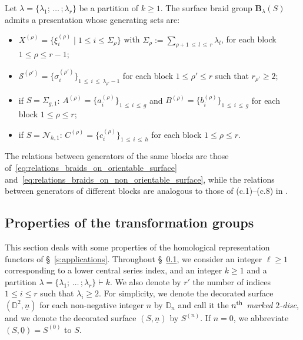 \documentclass[AHL,Unicode,published]{cedram}
\newcommand{\B}{\ensuremath{\mathbf{B}}}
\newcommand{\sS}{\mathscr{S}}
\newcommand{\N}{\mathscr{N}}
\newcommand{\bD}{\mathbb{D}}
\renewcommand{\geq}{\geqslant}
\renewcommand{\leq}{\leqslant}
\begin{document}
\begin{prop}\label{prop:partitioned_braid_groups_generating_sets}
Let $\lambda = \boldsymbol{\{} \lambda_{1};\,\ldots\,;\lambda_{r} \boldsymbol{\}}$ be a partition of $k\geq 1$. The surface braid group $\B_{\lambda}(S)$ admits a presentation whose generating sets are:
\begin{itemize}
\item $X^{(\rho)}=\{ \xi^{(\rho)}_{i}\mid 1\leq i\leq \varSigma_{\rho}\}$ with $\varSigma_{\rho}:=\sum_{\rho+1\,\leq\,l\,\leq\,r}\lambda_{l}$, for each block $1\leq \rho\leq r-1$;
\item $\sS^{(\rho')}=\{ \sigma_{i}^{(\rho')}\} _{1\,\leq \,i\,\leq\,\lambda_{\rho'}-1}$ for each block $1\leq \rho'\leq r$ such that $r_{\rho'}\geq 2$;
\item if $S=\Sigma_{g,1}$\textup{:} $A^{(\rho)}=\{ a^{(\rho)}_{i}\} _{1\,\leq\,i\,\leq\,g}$ and $B^{(\rho)}=\{ b^{(\rho)}_{i}\} _{1\,\leq\,i\,\leq\,g}$ for each block $1\leq \rho\leq r$;
\item if $S=\N_{h,1}$\textup{:} $C^{(\rho)}=\{ c^{(\rho)}_{i}\} _{1\,\leq\,i\,\leq\,h}$ for each block $1\leq \rho\leq r$.
\end{itemize}
The relations between generators of the same blocks are those of~\eqref{eq:relations_braids_on_orientable_surface} and~\eqref{eq:relations_braids_on_non_orientable_surface}, while the relations between generators of different blocks are analogous to those of \textup{(c.1)--(c.8)} in \textup{\cite[Prop.~3.2]{BellingeriGodelleGuaschi}}.
\end{prop}


\subsection{Properties of the transformation groups}\label{ss:appendix_computations}

This section deals with some properties of the homological representation functors of \S~\ref{s:applications}. Throughout \S~\ref{ss:appendix_computations}, we consider an integer $\ell\geq 1$ corresponding to a lower central series index, and an integer $k\geq 1$ and a partition $\lambda = \boldsymbol{\{} \lambda_{1};\,\ldots\,;\lambda_{r} \boldsymbol{\}} \vdash k$. We also denote by $r'$ the number of indices $1\leq i \leq r$ such that $\lambda_i \geq 2$. For simplicity, we denote the decorated surface $(\bD^{2},\underline{n})$ for each non-negative integer $n$ by $\bD_{n}$ and call it the \emph{$n^{\rm th}$ marked $2$-disc}, and we denote the decorated surface $(S,\underline{n})$ by $S^{(n)}$. If $n=0$, we abbreviate $(S,\underline{0}) = S^{(0)}$ to $S$.
\end{document}
